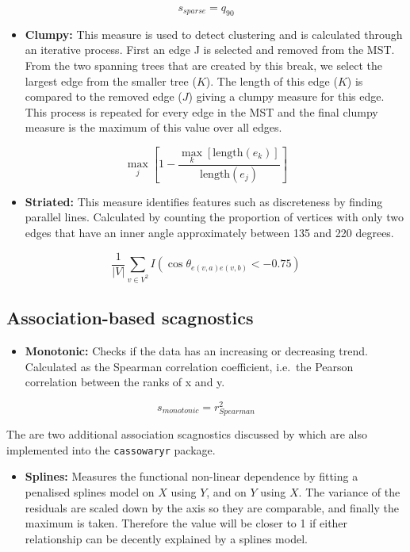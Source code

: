 \[s_{sparse}= q_{90}\]

\begin{itemize}
\tightlist
\item
  \textbf{Clumpy:} This measure is used to detect clustering and is calculated through an iterative process. First an edge J is selected and removed from the MST. From the two spanning trees that are created by this break, we select the largest edge from the smaller tree (\(K\)). The length of this edge (\(K\)) is compared to the removed edge (\(J\)) giving a clumpy measure for this edge. This process is repeated for every edge in the MST and the final clumpy measure is the maximum of this value over all edges.
\end{itemize}

\[\max_{j}\left[ 1-\frac{\max_{k}[\mbox{length}(e_k)]}{\mbox{length}(e_j)}\right]\]

\begin{itemize}
\tightlist
\item
  \textbf{Striated:} This measure identifies features such as discreteness by finding parallel lines. Calculated by counting the proportion of vertices with only two edges that have an inner angle approximately between 135 and 220 degrees.
\end{itemize}

\[\frac1{|V|}\sum_{v \in V^{2}}I(\cos\theta_{e(v,a)e(v,b)}<-0.75)\]

\subsection{Association-based scagnostics}\label{association-based-scagnostics}

\begin{itemize}
\tightlist
\item
  \textbf{Monotonic:} Checks if the data has an increasing or decreasing trend. Calculated as the Spearman correlation coefficient, i.e.~the Pearson correlation between the ranks of x and y.
\end{itemize}

\[s_{monotonic} = r^2_{Spearman}\]

The are two additional association scagnostics discussed by \citet{Grimm} which are also implemented into the \texttt{cassowaryr} package.

\begin{itemize}
\tightlist
\item
  \textbf{Splines:} Measures the functional non-linear dependence by fitting a penalised splines model on \(X\) using \(Y\), and on \(Y\) using \(X\). The variance of the residuals are scaled down by the axis so they are comparable, and finally the maximum is taken. Therefore the value will be closer to 1 if either relationship can be decently explained by a splines model.
\end{itemize}


